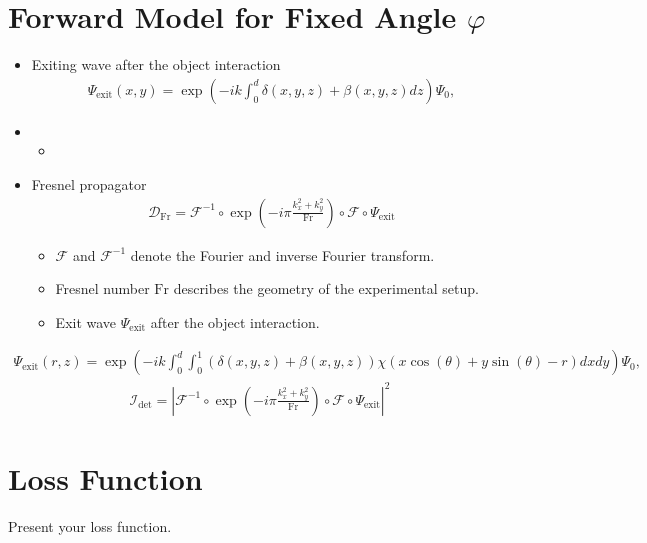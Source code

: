 \documentclass[a1paper, landscape,20pt]{extarticle}
\begin{document}
\begin{multicols}{3}
\section*{Forward Model for Fixed Angle $\varphi$}
\begin{itemize}
    \item Exiting wave after the object interaction
    \begin{align}
	\Psi_{\mathrm{exit}} \left( x,y \right) = \exp \left(  
		- ik \int_{0}^{d}
				\delta \left( x,y,z  \right) +  \beta \left( x,y,z \right) 
		dz \right) \Psi_{0},
    \end{align}
    \item 
    \begin{itemize}
        \item 
    \end{itemize}
    \item Fresnel propagator
    \begin{align*}
        \mathcal{D}_{\mathrm{Fr}} = \mathcal{F}^{-1} \circ \exp\left( -i \pi \frac{k_{x}^{2} + k_{y}^{2}}{\text{Fr}} \right) \circ \mathcal{F}  \circ \Psi_{\text{exit}}
    \end{align*}
    \begin{itemize}
        \item $\mathcal{F}$ and $\mathcal{F}^{-1}$ denote the Fourier and inverse Fourier transform.
        \item Fresnel number $\text{Fr}$ describes the geometry of the experimental setup.
        \item Exit wave $\Psi_{\text{exit}}$ after the object interaction.
    \end{itemize}
\end{itemize}
\begin{align}
	\Psi_{\text{exit}} \left( r, z \right) = \exp \left(  
		- ik \int_{0}^{d} \displaystyle \int_0^1
			\left( 
				\delta \left( x,y,z  \right) +  \beta \left( x,y,z \right) 
			\right) 
			\chi 
			\left( x \cos \left( \theta \right) + y \sin \left( \theta \right) - r \right) dxdy \right) \Psi_{0},
	\label{eq:thin-object}
    \end{align}
\begin{align}
	\mathcal{I}_{\text{det}} = \left| \mathcal{F}^{-1} \circ \exp\left( -i \pi \frac{k_{x}^{2} + k_{y}^{2}}{\text{Fr}} \right) \circ \mathcal{F}  \circ \Psi_{\text{exit}} \right|^{2} 
	\label{eq:Fresnel}
\end{align}

\section*{Loss Function}
Present your loss function.


\end{multicols}
\end{document}
